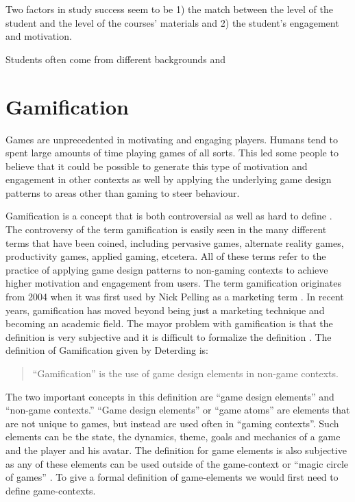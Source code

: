 \documentclass[11pt]{article}
\begin{document}
Two factors in study success seem to be 1) the match between the level of the student and the level of the courses' materials and 2) the student's engagement and motivation.

Students often come from different backgrounds and 

\cite{Horizon2012}









\section{Gamification}
Games are unprecedented in motivating and engaging players. Humans tend to spent large amounts of time playing games of all sorts. This led some people to believe that it could be possible to generate this type of motivation and engagement in other contexts as well by applying the underlying game design patterns to areas other than gaming to steer behaviour.

Gamification is a concept that is both controversial \cite{McGonigal2011} as well as hard to define \cite{Deterding2011}. The controversy of the term gamification is easily seen in the many different terms that have been coined, including pervasive games, alternate reality games, productivity games, applied gaming, etcetera. All of these terms refer to the practice of applying game design patterns to non-gaming contexts to achieve higher motivation and engagement from users. The term gamification originates from 2004 when it was first used by Nick Pelling as a marketing term \cite{Huotari2012}. In recent years, gamification has moved beyond being just a marketing technique and becoming an academic field. The mayor problem with gamification is that the definition is very subjective and it is difficult to formalize the definition \cite{Huotari2012, Deterding2011}. 
%
The definition of Gamification given by Deterding is:
\begin{quote}
	``Gamification'' is the use of game design elements in non-game contexts. 
\end{quote}

The two important concepts in this definition are ``game design elements'' and ``non-game contexts.'' ``Game design elements'' or ``game atoms'' \cite{Deterding2011, Brathwaite2008} are elements that are not unique to games, but instead are used often in ``gaming contexts''. Such elements can be the state, the dynamics, theme, goals and mechanics of a game and the player and his avatar. The definition for game elements is also subjective as any of these elements can be used outside of the game-context or ``magic circle of games'' \cite{Huizinga}. To give a formal definition of game-elements we would first need to define game-contexts.
\end{document}
